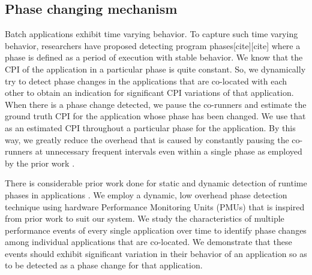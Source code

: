 \documentclass[pageno]{jpaper}
\begin{document}
\subsection{Phase changing mechanism}
\label{subsec:Phasechangingmechanism}

Batch applications exhibit time varying behavior. To capture such time varying behavior, researchers have proposed detecting program phases[cite][cite] where a phase is defined as a period of execution with stable behavior. We know that the CPI of the application in a particular phase is quite constant. So, we dynamically try to detect phase changes in the applications that are co-located with each other to obtain an indication for significant CPI variations of that application. When there is a phase change detected, we pause the co-runners and estimate the ground truth CPI for the application whose phase has been changed. We use that as an estimated CPI throughout a particular phase for the application. By this way, we greatly reduce the overhead that is caused by constantly pausing the co-runners at unnecessary frequent intervals even within a single phase as employed by the prior work \cite{fairpricing}.

There is considerable prior work done for static and dynamic detection of runtime phases in applications \cite{sembrand2011iiswc} \cite{Lukefahr:2012:CCP:2457472.2457508} \cite{6114207} \cite{Balasubramonian:2000:MHR:360128.360153} \cite{1402088} \cite{Sherwood:2003:PTP:871656.859657} \cite{Brankovic:2014:AOP:2597917.2597937}. We employ a dynamic, low overhead phase detection technique using hardware Performance Monitoring Units (PMUs) that is inspired from prior work to suit our system. We study the characteristics of multiple performance events of every single application over time to identify phase changes among individual applications that are co-located. We demonstrate that these events should exhibit significant variation in their behavior of an application so as to be detected as a phase change for that application.
\end{document}
